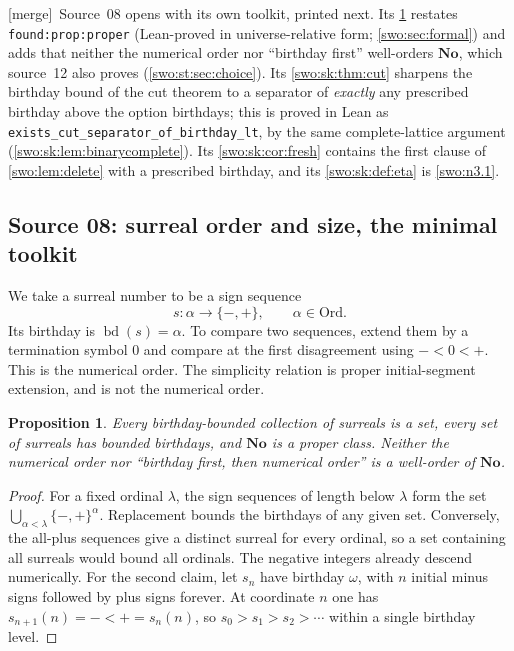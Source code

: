 \documentclass[11pt]{article}
\newtheorem{proposition}[proposition]{Proposition}
\theoremstyle{definition}
\theoremstyle{remark}
\newcommand{\No}{\mathbf{No}}
\newcommand{\Ord}{\mathrm{Ord}}
\newcommand{\bd}{\operatorname{bd}}
\newcommand{\code}[1]{\texttt{\small #1}}
\newcommand{\merge}{\textsf{[merge]}}
\begin{document}

\merge\ Source~08 opens with its own toolkit, printed next. Its
\cref{swo:sk:prop:size} restates \code{found:prop:proper} (Lean-proved in
universe-relative form; \cref{swo:sec:formal}) and adds that neither the
numerical order nor ``birthday first'' well-orders $\No$, which source~12
also proves (\cref{swo:st:sec:choice}). Its \cref{swo:sk:thm:cut} sharpens the
birthday bound of the cut theorem to a separator of \emph{exactly} any
prescribed birthday above the option birthdays; this is proved in Lean as
\code{exists\_cut\_separator\_of\_birthday\_lt}, by the same complete-lattice
argument (\cref{swo:sk:lem:binarycomplete}). Its \cref{swo:sk:cor:fresh}
contains the first clause of \cref{swo:lem:delete} with a prescribed
birthday, and its \cref{swo:sk:def:eta} is \cref{swo:n3.1}.

\subsection{Source 08: surreal order and size, the minimal toolkit}\label{swo:sk:sec:toolkit}

We take a surreal number to be a sign sequence
\[
 s:\alpha\longrightarrow\{-,+\},\qquad \alpha\in\Ord.
\]
Its birthday is $\bd(s)=\alpha$. To compare two sequences, extend them
by a termination symbol $0$ and compare at the first disagreement using
$-<0<+$. This is the numerical order. The simplicity relation is proper
initial-segment extension, and is not the numerical order.

\begin{proposition}\label{swo:sk:prop:size}
Every birthday-bounded collection of surreals is a set, every set of
surreals has bounded birthdays, and $\No$ is a proper class. Neither the
numerical order nor ``birthday first, then numerical order'' is a
well-order of $\No$.
\end{proposition}
\begin{proof}
For a fixed ordinal $\lambda$, the sign sequences of length below
$\lambda$ form the set $\bigcup_{\alpha<\lambda}\{-,+\}^{\alpha}$.
Replacement bounds the birthdays of any given set. Conversely, the
all-plus sequences give a distinct surreal for every ordinal, so a set
containing all surreals would bound all ordinals.
The negative integers already descend numerically. For the second
claim, let $s_n$ have birthday $\omega$, with $n$ initial minus signs
followed by plus signs forever. At coordinate $n$ one has
$s_{n+1}(n)=-<+=s_n(n)$, so
$s_0>s_1>s_2>\cdots$ within a single birthday level.
\end{proof}
\end{document}
